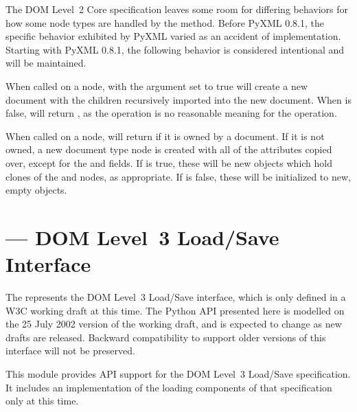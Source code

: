\documentclass{howto}
\begin{document}
 The DOM Level~2 Core
specification leaves some room for differing behaviors for how some
node types are handled by the  method.
Before PyXML 0.8.1, the specific behavior exhibited by PyXML varied as
an accident of implementation.  Starting with PyXML 0.8.1, the
following behavior is considered intentional and will be maintained.

When called on a  node,  with the
 argument set to true will create a new document with the
children recursively imported into the new document.  When 
is false,  will return , as the
operation is no reasonable meaning for the operation.

When called on a  node,  will
return  if it is owned by a document.  If it is not owned,
a new document type node is created with all of the attributes copied
over, except for the  and  fields.
If  is true, these will be new  objects
which hold clones of the  and  nodes, as
appropriate.  If  is false, these will be initialized to
new, empty  objects.



\section{ ---
         DOM Level~3 Load/Save Interface}



\begin{notice}[warning]
  The  represents the DOM Level~3 Load/Save
  interface, which is only defined in a W3C working draft at this
  time.  The Python API presented here is modelled on the 25 July 2002
  version of the working draft, and is expected to change as new
  drafts are released.  Backward compatibility to support older
  versions of this interface will not be preserved.
\end{notice}

This module provides API support for the DOM Level~3 Load/Save
specification.  It includes an implementation of the loading
components of that specification only at this time.
\end{document}
